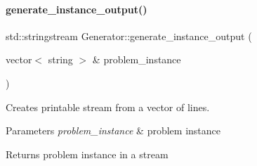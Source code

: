 \paragraph{\texorpdfstring{generate\+\_\+instance\+\_\+output()}{generate\_instance\_output()}\hspace{0.1cm}{\footnotesize\ttfamily [2/2]}}
{\footnotesize\ttfamily std\+::stringstream Generator\+::generate\+\_\+instance\+\_\+output (\begin{DoxyParamCaption}\item[{vector$<$ string $>$ \&}]{problem\+\_\+instance }\end{DoxyParamCaption})}

Creates printable stream from a vector of lines. 

\begin{DoxyParams}{Parameters}
{\em problem\+\_\+instance} & problem instance \\
\hline
\end{DoxyParams}
\begin{DoxyReturn}{Returns}
problem instance in a stream 
\end{DoxyReturn}